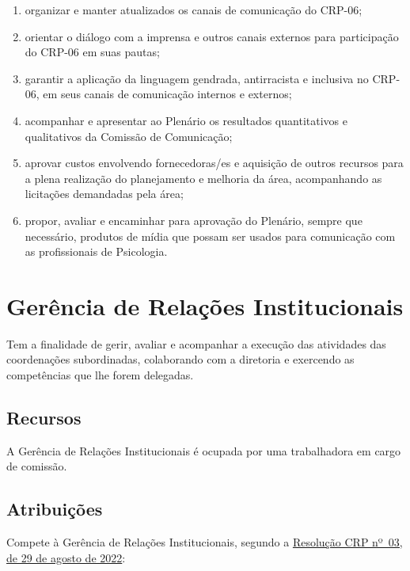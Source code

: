 \begin{enumerate}
        informações de domínio comum da entidade no site e redes sociais, bem
        como aquelas correlatas que lhe sejam atribuídas pelo Plenário;
  \item
        organizar e manter atualizados os canais de comunicação do CRP-06;
  \item
        orientar o diálogo com a imprensa e outros canais externos para
        participação do CRP-06 em suas pautas;
  \item
        garantir a aplicação da linguagem gendrada, antirracista e inclusiva
        no CRP-06, em seus canais de comunicação internos e externos;
  \item
        acompanhar e apresentar ao Plenário os resultados quantitativos e
        qualitativos da Comissão de Comunicação;
  \item
        aprovar custos envolvendo fornecedoras/es e aquisição de outros
        recursos para a plena realização do planejamento e melhoria da área,
        acompanhando as licitações demandadas pela área;
  \item
        propor, avaliar e encaminhar para aprovação do Plenário, sempre que
        necessário, produtos de mídia que possam ser usados para comunicação
        com as profissionais de Psicologia.
\end{enumerate}

\section{Gerência de Relações
  Institucionais}

Tem a finalidade de gerir, avaliar e acompanhar a execução das
atividades das coordenações subordinadas, colaborando com a diretoria e
exercendo as competências que lhe forem delegadas.

\subsection{Recursos}

A Gerência de Relações Institucionais é ocupada por uma trabalhadora em
cargo de comissão.

\subsection{Atribuições}

Compete à Gerência de Relações Institucionais, segundo a
\href{https://transparencia.cfp.org.br/crp06/wp-content/uploads/sites/29/2022/09/Resolucao-03-22-PECS-f-1-assinada.pdf}{Resolução
  CRP nº~03, de 29 de agosto de 2022}:

